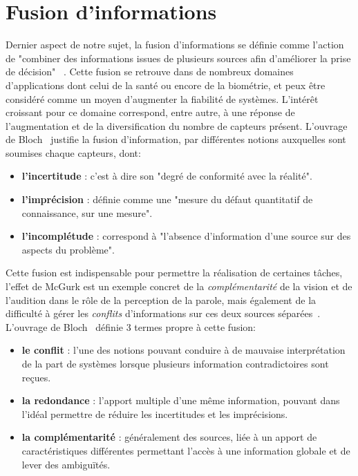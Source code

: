\clearpage

\section{Fusion d’informations}
Dernier aspect de notre sujet, la fusion d’informations se définie comme l’action de "combiner des informations issues de plusieurs sources afin d’améliorer la prise de décision" ~\cite{Bloch2003}. Cette fusion se retrouve dans de nombreux domaines d'applications dont celui de la santé ou encore de la biométrie, et peux être considéré comme un moyen d'augmenter la fiabilité de systèmes. L'intérêt croissant pour ce domaine correspond, entre autre, à une réponse de l'augmentation et de la diversification du nombre de capteurs présent. L'ouvrage de Bloch~\cite{Bloch2003} justifie la fusion d'information, par différentes notions auxquelles sont soumises chaque capteurs, dont:
\begin{itemize}
    \item \textbf{l'incertitude} : c'est à dire son "degré de conformité avec la réalité".
    \item \textbf{l'imprécision} : définie comme une "mesure du défaut quantitatif de connaissance, sur une mesure".
    \item \textbf{l'incomplétude} : correspond à "l'absence d'information d'une source sur des aspects du problème".
\end{itemize}\par

Cette fusion est indispensable pour permettre la réalisation de certaines tâches, l'effet de McGurk est un exemple concret de la \textit{complémentarité} de la vision et de l'audition dans le rôle de la perception de la parole, mais également de la difficulté à gérer les \textit{conflits} d'informations sur ces deux sources séparées~\cite{Mcgurk1976}. L'ouvrage de Bloch~\cite{Bloch2003} définie 3 termes propre à cette fusion:
\begin{itemize}
    \item \textbf{le conflit} : l'une des notions pouvant conduire à de mauvaise interprétation de la part de systèmes lorsque plusieurs information contradictoires sont reçues.
    \item \textbf{la redondance} : l'apport multiple d'une même information, pouvant dans l'idéal permettre de réduire les incertitudes et les imprécisions.
    \item \textbf{la complémentarité} : généralement des sources, liée à un apport de caractéristiques différentes permettant l'accès à une information globale et de lever des ambiguïtés.
\end{itemize}\par

